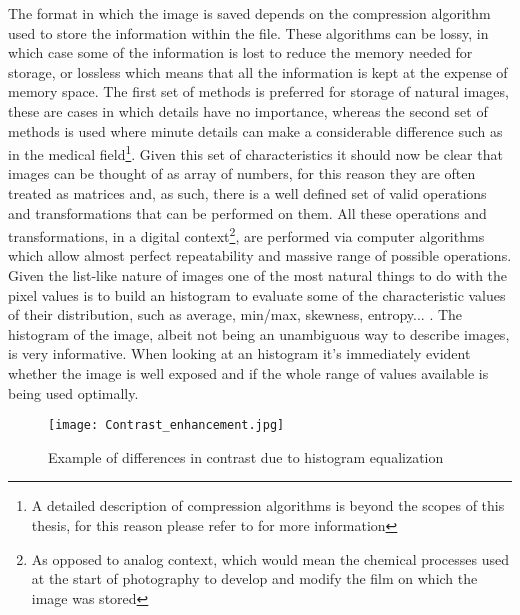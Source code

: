 The format in which the image is saved depends on the compression algorithm used to store the information within the file. These algorithms can be lossy, in which case some of the information is lost to reduce the memory needed for storage, or lossless which means that all the information is kept at the expense of memory space. The first set of methods is preferred for storage of natural images, these are cases in which details have no importance, whereas the second set of methods is used where minute details can make a considerable difference such as in the medical field\footnote{A detailed description of compression algorithms is beyond the scopes of this thesis, for this reason please refer to \cite{Img_Compression} for more information}.
Given this set of characteristics it should now be clear that images can be thought of as array of numbers, for this reason they are often treated as matrices and, as such, there is a well defined set of valid operations and transformations that can be performed on them. All these operations and transformations, in a digital context\footnote{As opposed to analog context, which would mean the chemical processes used at the start of photography to develop and modify the film on which the image was stored}, are performed via computer algorithms which allow almost perfect repeatability and massive range of possible operations. 
Given the list-like nature of images one of the most natural things to do with the pixel values is to build an histogram to evaluate some of the characteristic values of their distribution, such as average, min/max, skewness, entropy... . The histogram of the image, albeit not being an unambiguous way to describe images, is very informative. When looking at an histogram it's immediately evident whether the image is well exposed and if the whole range of values available is being used optimally. 

\begin{figure}[H]
  		\texttt{[image: Contrast\_enhancement.jpg]}
        \caption{Example of differences in contrast due to histogram equalization\label{fig:contrast_enhancement}}
\end{figure}


